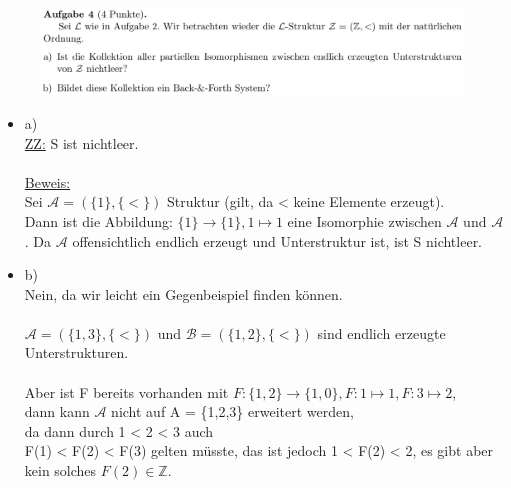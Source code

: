 \documentclass[a4paper]{scrartcl}
\begin{document}
    \begin{figure}[H]
        \centering
        \includegraphics[scale=0.3]{./A-4.png}
        \label{fig:}
    \end{figure}

    \begin{itemize}
        \item a)\\
            \underline{ZZ:} S ist nichtleer.\\
            \\\underline{Beweis:}\\ 
            Sei $\mathcal{A} = (\{1\}, \{<\})$ Struktur (gilt, da < keine Elemente erzeugt).\\
            Dann ist die Abbildung: $\{1\} \rightarrow \{1\}, 1 \mapsto 1$ eine Isomorphie zwischen $\mathcal{A} \text{ und } \mathcal{A}$.
            Da $\mathcal{A}$ offensichtlich endlich erzeugt und Unterstruktur ist, ist S nichtleer.\\

        \item b)\\
            Nein, da wir leicht ein Gegenbeispiel finden können.\\
            \\$\mathcal{A} = (\{1,3\}, \{<\}) \text{ und } \mathcal{B} = (\{1,2\}, \{<\})$ sind endlich erzeugte Unterstrukturen.\\
            \\Aber ist F bereits vorhanden mit $F: \{1,2\} \rightarrow \{1,0\}, F: 1 \mapsto 1, F: 3 \mapsto 2$,\\
            dann kann $\mathcal{A}$ nicht auf A = \{1,2,3\} erweitert werden,\\
            da dann durch 1 < 2 < 3 auch\\
            F(1) < F(2) < F(3) gelten müsste, das ist jedoch 1 < F(2) < 2, es gibt aber kein solches $F(2) \in \mathds{Z}$.\\

    \end{itemize}%
\end{document}
